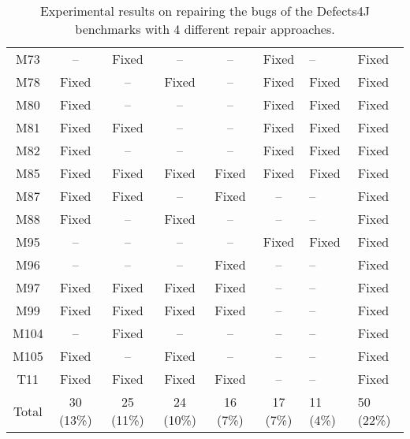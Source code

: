 \begin{table}[!t]
{\begin{tabular}{|c|c|c|c|c|c|}
M73               & --        & Fixed     & --        & --        & Fixed     & --        &Fixed   \\
M78               & Fixed     & --        & Fixed     & --        & Fixed     & Fixed     &Fixed   \\
M80               & Fixed     & --        & --        & --        & Fixed     & Fixed     &Fixed   \\
M81               & Fixed     & Fixed     & --        & --        & Fixed     & Fixed     &Fixed   \\
M82               & Fixed     & --        & --        & --        & Fixed     & Fixed     &Fixed   \\
M85               & Fixed     & Fixed     & Fixed     & Fixed     & Fixed     & Fixed     &Fixed   \\
M87               & Fixed     & Fixed     & --        & Fixed     & --        & --        &Fixed   \\
M88               & Fixed     & --        & Fixed     & --        & --        & --        &Fixed   \\
M95               & --        & --        & --        & --        & Fixed     & Fixed     &Fixed   \\
M96               & --        & --        & --        & Fixed     & --        & --        &Fixed   \\
M97               & Fixed     & Fixed     & Fixed     & Fixed     & --        & --        &Fixed   \\
M99               & Fixed     & Fixed     & Fixed     & Fixed     & --        & --        &Fixed   \\
M104              & --        & Fixed     & --        & --        & --        & --        &Fixed   \\
M105              & Fixed     & --        & Fixed     & --        & --        & --        &Fixed   \\
\hline
T11               & Fixed     & Fixed     & Fixed     & Fixed     & --        & --        &Fixed   \\
\hline
Total             & 30 (13\%) & 25 (11\%) & 24 (10\%) & 16 (7\%)  & 17 (7\%)  & 11 (4\%)  & 50 (22\%)\\
\hline 
\end{tabular}%
}
\caption{Experimental results on repairing the bugs of the Defects4J benchmarks with 4 different repair approaches.}
\end{table}

